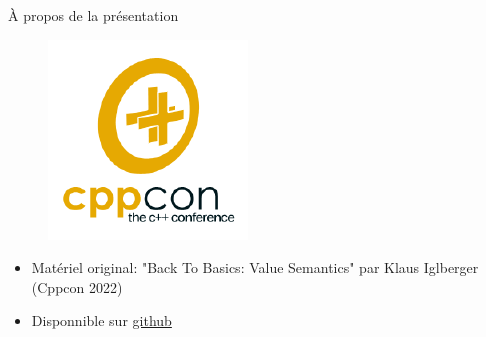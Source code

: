\documentclass[french]{beamer}
\begin{document}
\begin{frame}{À propos de la présentation}
    \begin{minipage}{0.3\linewidth}
    \begin{figure}
        \includegraphics[width=\linewidth]{cppcon.png}
    \end{figure}
    \end{minipage}
    \begin{minipage}{0.68\linewidth}
        \begin{itemize}
            \item Matériel original: "Back To Basics: Value Semantics" par Klaus Iglberger (Cppcon 2022)
            \item Disponnible sur \href{https://github.com/CppCon/CppCon2022/blob/main/Presentations/Back-to-Basics-Value-Semantics-Klaus-Iglberger-CppCon-2022.pdf}{github}
        \end{itemize}
    \end{minipage}
\end{frame}
\end{document}
